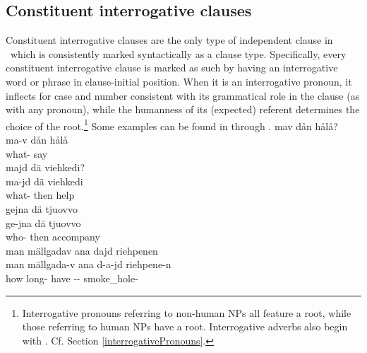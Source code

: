 \subsection{Constituent interrogative clauses}\label{constituentQs}
Constituent interrogative clauses are the only type of independent clause in \PS\ which is consistently marked syntactically as a clause type. Specifically, every constituent interrogative clause is marked as such by having an interrogative word or phrase in clause-initial position. When it is an interrogative pronoun, it inflects for case and number consistent with its grammatical role in the clause (as with any pronoun), while the humanness of its (expected) referent determines the choice of the root.\footnote{Interrogative pronouns referring to non-human NPs all feature a  root, while those referring to human NPs have a  root. Interrogative adverbs also begin with . Cf. Section \ref{interrogativePronouns}.} 
Some examples can be found in  through . 
\ea\label{questionWordQ1}%
\glll	mav dån hålå?\\
	ma-v dån hålå\\
	what-  say\BS{}\\\nopagebreak
{} 
\z
\ea\label{questionWordQ2}%
\glll	majd dä viehkedi?\\
	ma-jd dä viehkedi\\
	what- then help\BS{}\\\nopagebreak
{} 
\z
\ea\label{questionWordQ3}%
\glll	gejna dä tjuovvo\\
	ge-jna dä tjuovvo\\
	who- then accompany\BS{}\\\nopagebreak
{} 
\z
\ea\label{questionWordQ4}%
\glll	man mällgadav ana dajd riehpenen\\
	man mällgada-v ana d-a-jd riehpene-n\\
	how long- have\BS{} -- smoke\_hole-\\\nopagebreak
{} 
\z{}

